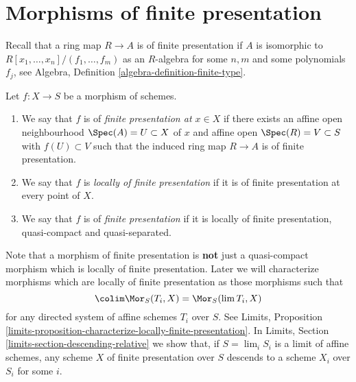 \section{Morphisms of finite presentation}
\label{section-finite-presentation}

\noindent
Recall that a ring map $R \to A$ is of finite presentation if
$A$ is isomorphic to $R[x_1, \ldots, x_n]/(f_1, \ldots, f_m)$ as
an $R$-algebra for some $n, m$ and some polynomials $f_j$, see
Algebra, Definition \ref{algebra-definition-finite-type}.

\begin{definition}
\label{definition-finite-presentation}
Let $f : X \to S$ be a morphism of schemes.
\begin{enumerate}
\item We say that $f$ is of {\it finite presentation at $x \in X$} if
there exists an affine open neighbourhood $\Spec(A) = U \subset X$
of $x$ and affine open $\Spec(R) = V \subset S$
with $f(U) \subset V$ such that the induced ring map
$R \to A$ is of finite presentation.
\item We say that $f$ is {\it locally of finite presentation} if it is
of finite presentation at every point of $X$.
\item We say that $f$ is of {\it finite presentation} if it is locally of
finite presentation, quasi-compact and quasi-separated.
\end{enumerate}
\end{definition}

\noindent
Note that a morphism of finite presentation is {\bf not} just a quasi-compact
morphism which is locally of finite presentation.
Later we will characterize morphisms which are
locally of finite presentation as those morphisms such that
$$
\colim \Mor_S(T_i, X) = \Mor_S(\lim T_i, X)
$$
for any directed system of affine schemes $T_i$ over $S$. See
Limits,
Proposition \ref{limits-proposition-characterize-locally-finite-presentation}.
In Limits, Section \ref{limits-section-descending-relative} we show
that, if $S = \lim_i S_i$ is a limit of affine schemes,
any scheme $X$ of finite presentation over $S$ descends to a scheme
$X_i$ over $S_i$ for some $i$.

